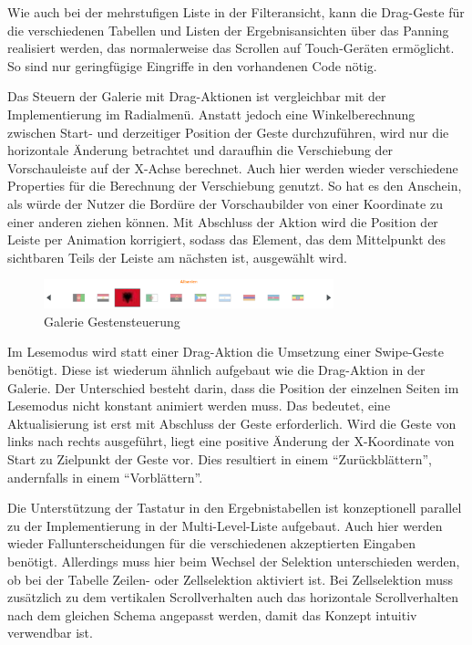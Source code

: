 Wie auch bei der mehrstufigen Liste in der Filteransicht, kann die Drag-Geste für die verschiedenen Tabellen und Listen der Ergebnisansichten über das Panning realisiert werden, das normalerweise das Scrollen auf Touch-Geräten ermöglicht. So sind nur geringfügige Eingriffe in den vorhandenen Code nötig.\par
Das Steuern der Galerie mit Drag-Aktionen ist vergleichbar mit der Implementierung im Radialmenü. Anstatt jedoch eine Winkelberechnung zwischen Start- und derzeitiger Position der Geste durchzuführen, wird nur die horizontale Änderung betrachtet und daraufhin die Verschiebung der Vorschauleiste auf der X-Achse berechnet. Auch hier werden wieder verschiedene Properties für die Berechnung der Verschiebung genutzt. So hat es den Anschein, als würde der Nutzer die Bordüre der Vorschaubilder von einer Koordinate zu einer anderen ziehen können. Mit Abschluss der Aktion wird die Position der Leiste per Animation korrigiert, sodass das Element, das dem Mittelpunkt des sichtbaren Teils der Leiste am nächsten ist, ausgewählt wird.\par
\begin{figure}[H]
 \centering
 \includegraphics[width=0.75\textwidth]{grafiken/gallery_drag.png}
 \caption{Galerie Gestensteuerung}
 \label{fig:mllKeyCapture}
\end{figure}
Im Lesemodus wird statt einer Drag-Aktion die Umsetzung einer Swipe-Geste benötigt. Diese ist wiederum ähnlich aufgebaut wie die Drag-Aktion in der Galerie. Der Unterschied besteht darin, dass die Position der einzelnen Seiten im Lesemodus nicht konstant animiert werden muss.  Das bedeutet, eine Aktualisierung ist erst mit Abschluss der Geste erforderlich. Wird die Geste von links nach rechts ausgeführt, liegt eine positive Änderung der X-Koordinate von Start zu Zielpunkt der Geste vor. Dies resultiert in einem \enquote{Zurückblättern}, andernfalls in einem \enquote{Vorblättern}.\par
Die Unterstützung der Tastatur in den Ergebnistabellen ist konzeptionell parallel zu der Implementierung in der Multi-Level-Liste aufgebaut. Auch hier werden wieder Fallunterscheidungen für die verschiedenen akzeptierten Eingaben benötigt. Allerdings muss hier beim Wechsel der Selektion unterschieden werden, ob bei der Tabelle Zeilen- oder Zellselektion aktiviert ist. Bei Zellselektion muss zusätzlich zu dem vertikalen Scrollverhalten auch das horizontale Scrollverhalten nach dem gleichen Schema angepasst werden, damit das Konzept intuitiv verwendbar ist.\par
